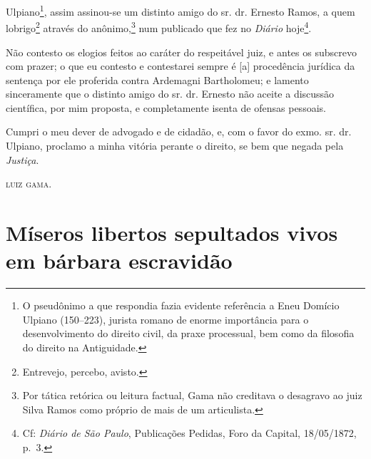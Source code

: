 Ulpiano\footnote{ O pseudônimo a que respondia fazia evidente
  referência a Eneu Domício Ulpiano (150--223), jurista romano de enorme
  importância para o desenvolvimento do direito civil, da praxe
  processual, bem como da filosofia do direito na Antiguidade.}, assim
assinou-se um distinto amigo do sr. dr. Ernesto Ramos, a quem
lobrigo\footnote{ Entrevejo, percebo, avisto.} através do
anônimo,\footnote{ Por tática retórica ou leitura factual, Gama não
  creditava o desagravo ao juiz Silva Ramos como próprio de mais de um
  articulista.} num publicado que fez no \emph{Diário} hoje\footnote{
  Cf: \emph{Diário de São Paulo}, Publicações Pedidas, Foro da Capital,
  18/05/1872, p.~3.}.

Não contesto os elogios feitos ao caráter do respeitável juiz, e antes
os subscrevo com prazer; o que eu contesto e contestarei sempre é
{[}a{]} procedência jurídica da sentença por ele proferida contra
Ardemagni Bartholomeu; e lamento sinceramente que o distinto amigo do
sr. dr. Ernesto não aceite a discussão científica, por mim proposta, e
completamente isenta de ofensas pessoais.

Cumpri o meu dever de advogado e de cidadão, e, com o favor do exmo. sr.
dr. Ulpiano, proclamo a minha vitória perante o direito, se bem que
negada pela \emph{Justiça}.

\textsc{luiz gama}.

\part{Míseros libertos sepultados vivos em bárbara escravidão}

